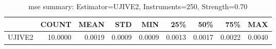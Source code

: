 \begin{table}[ht]
\centering
\caption{mse summary: Estimator=UJIVE2, Instruments=250, Strength=0.70}
\begin{tabular}{lrrrrrrrr}
\toprule
 & COUNT & MEAN & STD & MIN & 25\% & 50\% & 75\% & MAX \\
\midrule
UJIVE2 & 10.0000 & 0.0019 & 0.0009 & 0.0009 & 0.0013 & 0.0017 & 0.0022 & 0.0040 \\
\bottomrule
\end{tabular}
\end{table}
